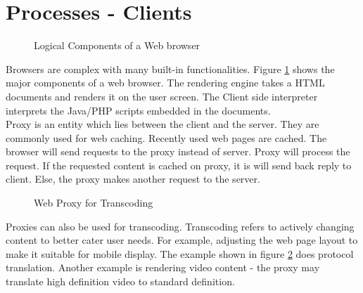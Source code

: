 \documentclass[twoside]{article}
\begin{document}
\section{Processes - Clients}
\begin{figure}[h]
\begin{center}
\caption{Logical Components of a Web browser}
\label{components}
\end{center}
\end{figure}
Browsers are complex with many built-in functionalities. Figure \ref{components} shows the major components of a web browser. The rendering engine takes a HTML documents and renders it on the user screen. The Client side interpreter interprets the Java/PHP scripts embedded in the documents. \\
Proxy is an entity which lies between the client and the server. They are commonly used for web caching. Recently used web pages are cached. The browser will send requests to the proxy instead of server. Proxy will process the request. If the requested content is cached on proxy, it is will send back reply to client. Else, the proxy makes another request to the server.\\
\begin{figure}[h]
\begin{center}
\caption{Web Proxy for Transcoding}
\label{transcoding}
\end{center}
\end{figure}
Proxies can also be used for transcoding. Transcoding refers to actively changing content to better cater user needs. For example, adjusting the web page layout to make it suitable for mobile display. The example shown in figure \ref{transcoding} does protocol translation. Another example is rendering video content - the proxy may translate high definition video to standard definition.
\end{document}
